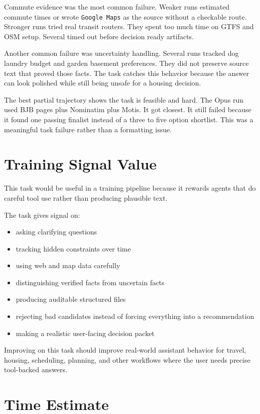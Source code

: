 \documentclass[11pt]{article}
\begin{document}
Commute evidence was the most common failure. Weaker runs estimated commute
times or wrote \texttt{Google Maps} as the source without a checkable route.
Stronger runs tried real transit routers. They spent too much time on GTFS and
OSM setup. Several timed out before decision ready artifacts.

Another common failure was uncertainty handling. Several runs tracked dog
laundry budget and garden basement preferences. They did not preserve source
text that proved those facts. The task catches this behavior because the answer
can look polished while still being unsafe for a housing decision.

The best partial trajectory shows the task is feasible and hard. The Opus run
used BJB pages plus Nominatim plus Motis. It got closest. It still failed
because it found one passing finalist instead of a three to five option
shortlist. This was a meaningful task failure rather than a formatting issue.

\section{Training Signal Value}

This task would be useful in a training pipeline because it rewards agents that
do careful tool use rather than producing plausible text.

The task gives signal on:

\begin{itemize}
  \item asking clarifying questions
  \item tracking hidden constraints over time
  \item using web and map data carefully
  \item distinguishing verified facts from uncertain facts
  \item producing auditable structured files
  \item rejecting bad candidates instead of forcing everything into a recommendation
  \item making a realistic user-facing decision packet
\end{itemize}

Improving on this task should improve real-world assistant behavior for travel,
housing, scheduling, planning, and other workflows where the user needs precise
tool-backed answers.

\section{Time Estimate}
\end{document}
